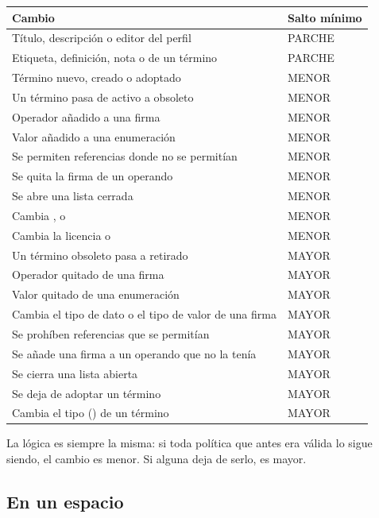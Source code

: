 \begin{longtable}{@{}L{9.4cm}C{2cm}@{}}
\toprule
\textbf{Cambio} & \textbf{Salto mínimo} \\
\midrule
\endhead
Título, descripción o editor del perfil & PARCHE \\
Etiqueta, definición, nota o  de un término & PARCHE \\
\midrule
Término nuevo, creado o adoptado & MENOR \\
Un término pasa de activo a obsoleto & MENOR \\
Operador añadido a una firma & MENOR \\
Valor añadido a una enumeración & MENOR \\
Se permiten referencias donde no se permitían & MENOR \\
Se quita la firma de un operando & MENOR \\
Se abre una lista cerrada & MENOR \\
Cambia ,  o  & MENOR \\
Cambia la licencia o  & MENOR \\
\midrule
Un término obsoleto pasa a retirado & MAYOR \\
Operador quitado de una firma & MAYOR \\
Valor quitado de una enumeración & MAYOR \\
Cambia el tipo de dato o el tipo de valor de una firma & MAYOR \\
Se prohíben referencias que se permitían & MAYOR \\
Se añade una firma a un operando que no la tenía & MAYOR \\
Se cierra una lista abierta & MAYOR \\
Se deja de adoptar un término & MAYOR \\
Cambia el tipo () de un término & MAYOR \\
\bottomrule
\end{longtable}

La lógica es siempre la misma: si toda política que antes era válida lo sigue siendo, el cambio es menor. Si
alguna deja de serlo, es mayor.

\subsection{En un espacio}

